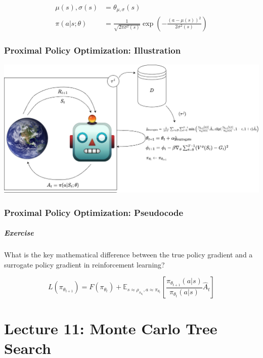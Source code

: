 \documentclass[
  letterpaper,
  DIV=11,
  numbers=noendperiod]{scrreprt}
\begin{document}
\[
\begin{aligned}
    \mu(s), \sigma(s) &= \theta_{\mu, \sigma}(s) \\
    \pi(a|s; \theta) &= \frac{1}{\sqrt{2 \pi \sigma^2(s)}} \exp\left(-\frac{(a - \mu(s))^2}{2 \sigma^2(s)}\right)
\end{aligned}
\]

\section{Proximal Policy Optimization:
Illustration}\label{proximal-policy-optimization-illustration}

\includegraphics[width=1\linewidth,height=\textheight,keepaspectratio]{lecture10/images/PPOClip.png}

\section{Proximal Policy Optimization:
Pseudocode}\label{proximal-policy-optimization-pseudocode}

\subsubsection{\texorpdfstring{ Exercise
}{ Exercise }}\label{exercise-16}

What is the key mathematical difference between the true policy gradient
and a surrogate policy gradient in reinforcement learning?

\[
L(\pi_{\theta_{t+1}}) =  F(\pi_{\theta_{t}}) + \mathbb{E}_{s \approx \rho_{\pi_{\theta_{t}}}, a \approx \pi_{\theta_{t}}} \left[\frac{\pi_{\theta_{t+1}}(a|s)}{\pi_{\theta_{t}}(a|s)} \hat{A}_t\right]
\]

\part{Lecture 11: Monte Carlo Tree Search}
\end{document}
